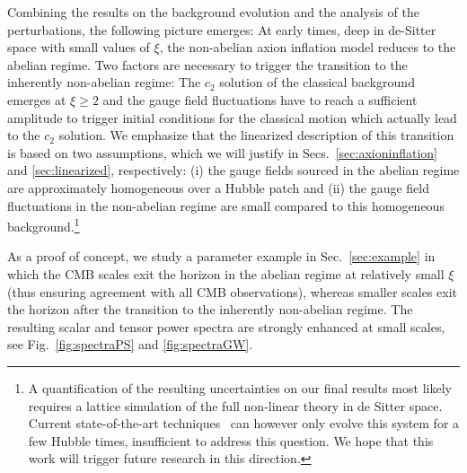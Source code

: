 Combining the results on the background evolution and the analysis of the perturbations, the following picture emerges: At early times, deep in de-Sitter space with small values of $\xi$, the non-abelian axion inflation model reduces to the abelian regime. Two factors are necessary to trigger the transition to the inherently non-abelian regime: The $c_2$ solution of the classical background emerges at $\xi \geq 2$ and the gauge field fluctuations have to reach a sufficient amplitude to trigger initial conditions for the classical motion which actually lead to the $c_2$ solution. We emphasize that the linearized description of this transition is based on two assumptions, which we will justify in Secs.~\ref{sec:axioninflation} and \ref{sec:linearized}, respectively: (i) the gauge fields sourced in the abelian regime are approximately homogeneous over a Hubble patch and (ii) the gauge field fluctuations in the non-abelian regime are small compared to this homogeneous background.\footnote{A quantification of the resulting uncertainties on our final results most likely requires a lattice simulation of the full non-linear theory in de Sitter space. Current state-of-the-art techniques~\cite{Adshead:2015pva,Cuissa:2018oiw} can however only evolve this system for a few Hubble times, insufficient to address this question. We hope that this work will trigger future research in this direction. }

As a proof of concept, we study a parameter example in Sec.~\ref{sec:example} in which the CMB scales exit the horizon in the abelian regime at relatively small $\xi$ (thus ensuring agreement with all CMB observations), whereas smaller scales exit the horizon after the transition to the inherently non-abelian regime. The resulting scalar and tensor power spectra are strongly enhanced at small scales, see Fig.~\ref{fig:spectraPS} and \ref{fig:spectraGW}.

